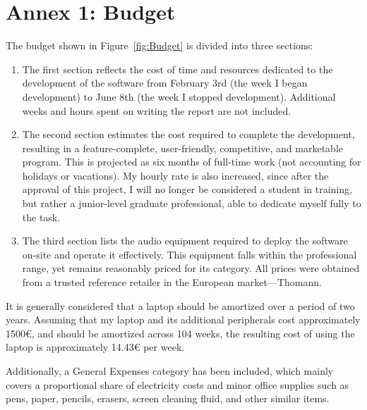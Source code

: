 \chapter{Annex 1: Budget}

The budget shown in Figure~\ref{fig:Budget} is divided into three sections:


\begin{enumerate}
	\item The first section reflects the cost of time and resources dedicated to the development of the software from February 3rd (the week I began development) to June 8th (the week I stopped development). Additional weeks and hours spent on writing the report are not included.
	
	\item The second section estimates the cost required to complete the development, resulting in a feature-complete, user-friendly, competitive, and marketable program. This is projected as six months of full-time work (not accounting for holidays or vacations). My hourly rate is also increased, since after the approval of this project, I will no longer be considered a student in training, but rather a junior-level graduate professional, able to dedicate myself fully to the task.
	
	\item The third section lists the audio equipment required to deploy the software on-site and operate it effectively. This equipment falls within the professional range, yet remains reasonably priced for its category. All prices were obtained from a trusted reference retailer in the European market—Thomann\cite{thomann}.
\end{enumerate}

It is generally considered that a laptop should be amortized over a period of two years. Assuming that my laptop and its additional peripherals cost approximately 1500€, and should be amortized across 104 weeks, the resulting cost of using the laptop is approximately 14.43€ per week.

Additionally, a General Expenses category has been included, which mainly covers a proportional share of electricity costs and minor office supplies such as pens, paper, pencils, erasers, screen cleaning fluid, and other similar items.


